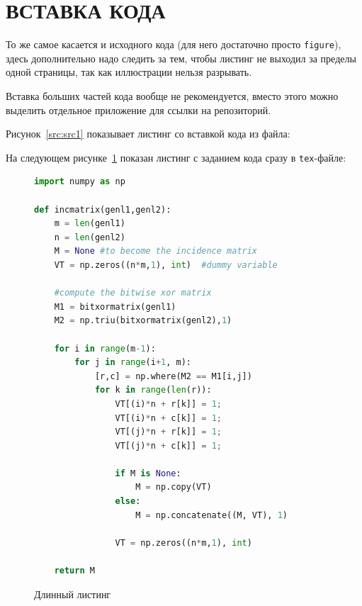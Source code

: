 \section{ВСТАВКА КОДА}

То же самое касается и исходного кода (для него достаточно просто \texttt{figure}), здесь дополнительно надо следить за тем, чтобы листинг не выходил за пределы одной страницы, так как иллюстрации нельзя разрывать.

Вставка больших частей кода вообще не рекомендуется, вместо этого можно выделить отдельное приложение для ссылки на репозиторий.

Рисунок~\ref{src:src1} показывает листинг со вставкой кода из файла:

\pagebreak

На следующем рисунке~\ref{src:src2} показан листинг с заданием кода сразу в \texttt{tex}-файле:

\begin{figure}
\begin{lstlisting}[language=Python]
import numpy as np
    
def incmatrix(genl1,genl2):
    m = len(genl1)
    n = len(genl2)
    M = None #to become the incidence matrix
    VT = np.zeros((n*m,1), int)  #dummy variable
    
    #compute the bitwise xor matrix
    M1 = bitxormatrix(genl1)
    M2 = np.triu(bitxormatrix(genl2),1) 

    for i in range(m-1):
        for j in range(i+1, m):
            [r,c] = np.where(M2 == M1[i,j])
            for k in range(len(r)):
                VT[(i)*n + r[k]] = 1;
                VT[(i)*n + c[k]] = 1;
                VT[(j)*n + r[k]] = 1;
                VT[(j)*n + c[k]] = 1;
                
                if M is None:
                    M = np.copy(VT)
                else:
                    M = np.concatenate((M, VT), 1)
                
                VT = np.zeros((n*m,1), int)
    
    return M
\end{lstlisting}
\caption{Длинный листинг}
\label{src:src2}
\end{figure}